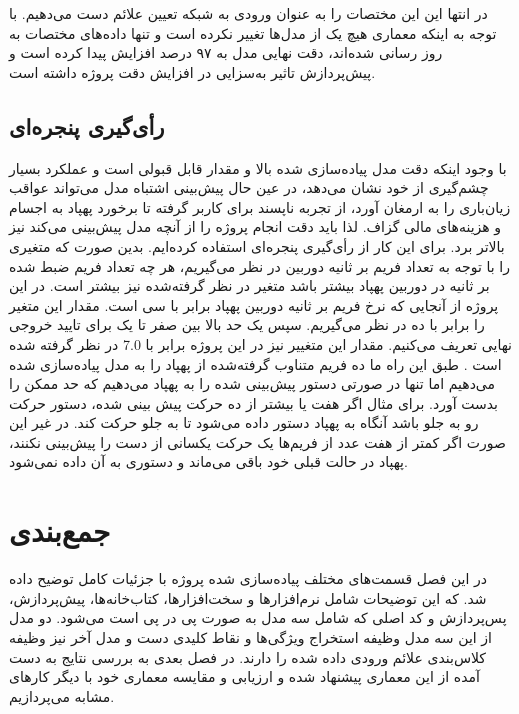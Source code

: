 در انتها این این مختصات را به عنوان ورودی به شبکه تعیین علائم دست می‌دهیم. با توجه به اینکه معماری هیچ یک از مدل‌ها تغییر نکرده است و تنها داده‌های مختصات به روز رسانی شده‌اند، 
دقت نهایی مدل به ۹۷ درصد افزایش پیدا کرده است و پیش‌پردازش تاثیر به‌سزایی در افزایش دقت پروژه داشته است.


\subsection{رأی‌گیری پنجره‌ای}
با وجود اینکه دقت مدل پیاده‌سازی شده بالا و مقدار قابل قبولی است و عملکرد بسیار چشم‌گیری از خود نشان می‌دهد، در عین حال پیش‌بینی اشتباه مدل می‌تواند عواقب زیان‌باری را به ارمغان آورد، 
از تجربه ناپسند برای کاربر گرفته تا برخورد پهپاد به اجسام و هزینه‌های مالی گزاف. لذا باید دقت انجام پروژه را از آنچه مدل پیش‌بینی می‌کند نیز بالاتر برد. برای این کار از رأی‌گیری پنجره‌ای 
استفاده کرده‌ایم. بدین صورت که متغیری را با توجه به تعداد فریم بر ثانیه دوربین در نظر می‌گیریم، هر چه تعداد فریم ضبط شده بر ثانیه در دوربین پهپاد بیشتر باشد متغیر در نظر گرفته‌شده نیز بیشتر 
است. در این پروژه از آنجایی که نرخ فریم بر ثانیه دوربین پهپاد برابر با سی است.  مقدار این متغیر را برابر با ده در نظر می‌گیریم.  سپس یک حد بالا بین صفر تا یک برای تایید خروجی نهایی تعریف می‌کنیم. مقدار این متغییر نیز در این پروژه برابر با 7.0 در نظر گرفته شده است . طبق این راه ما ده فریم متناوب گرفته‌شده از پهپاد را به مدل پیاده‌سازی شده می‌دهیم اما تنها در صورتی دستور پیش‌بینی شده را به 
پهپاد می‌دهیم که حد ممکن را بدست آورد. برای مثال اگر هفت یا بیشتر از ده حرکت پیش بینی شده، دستور حرکت رو به جلو باشد آنگاه به پهپاد دستور داده می‌شود تا به جلو حرکت کند. 
در غیر این صورت اگر کمتر از هفت عدد از فریم‌ها یک   حرکت یکسانی از دست را پیش‌بینی نکنند، پهپاد در حالت قبلی خود باقی می‌ماند و دستوری به آن داده نمی‌شود.




\section{جمع‌بندی}
در این فصل قسمت‌های مختلف پیاده‌سازی شده پروژه با جزئیات کامل توضیح داده شد. که این توضیحات شامل نرم‌افزار‌ها و سخت‌افزارها، کتاب‌خانه‌ها، پیش‌پردازش، پس‌پردازش و کد اصلی که شامل سه مدل به صورت پی در پی است می‌شود.
دو مدل از این سه مدل وظیفه استخراج ویژگی‌ها و نقاط کلیدی دست و مدل آخر نیز وظیفه کلاس‌بندی علائم ورودی داده شده را دارند.
در فصل بعدی به بررسی نتایج به دست آمده از این معماری پیشنهاد شده و ارزیابی و مقایسه معماری خود با دیگر کار‌های مشابه می‌پردازیم.


